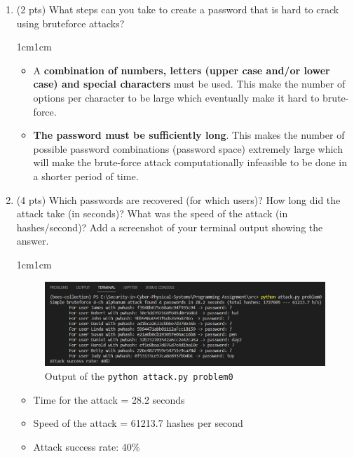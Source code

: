 \documentclass[11pt,letterpaper]{article}
\newenvironment{answer}{\em \color{blue} \begin{adjustwidth}{1cm}{1cm}}{\end{adjustwidth}}
\begin{document}
	\begin{enumerate}
		
		\item (2 pts) What steps can you take to create a password that is hard to crack using bruteforce attacks?
		
		\begin{answer}
			
			\begin{itemize}
				\item A \textbf{combination of numbers, letters (upper case and/or lower case)  and special characters} must be used. This make the number of options per character to be large which eventually make it hard to brute-force.
				
				\item \textbf{The password must be sufficiently long}. This makes the number of possible password combinations (password space) extremely large which will make the brute-force attack computationally infeasible to be done in a shorter period of time. 
			\end{itemize}
			
		\end{answer}
		
		\item (4 pts) Which passwords are recovered (for which users)? How long did the attack take (in seconds)? What was the speed of the attack (in hashes/second)? Add a screenshot of your terminal output showing the answer.
				
		
		\begin{answer}
			
			\begin{figure}[h]
				\centering
				\includegraphics[width=0.8\columnwidth]{images/p0/q1.png}
				\caption{Output of the {\tt python attack.py problem0}}
			\end{figure}
			
			\begin{itemize}
				\item Time for the attack = 28.2 seconds
				\item Speed of the attack = 61213.7 hashes per second
				\item Attack success rate: 40\%				
			\end{itemize}
			

\end{answer}
\end{enumerate}
\end{document}
